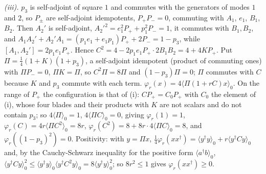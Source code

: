 \emph{(iii).} $p_{3}$ is self-adjoint of square $1$ and commutes with the generators of modes $1$ and $2$, so $P_{\pm}$ are self-adjoint idempotents, $P_{+}P_{-} = 0$, commuting with $A_{1}$, $e_{1}$, $B_{1}$, $B_{2}$. Then $A_{2}'$ is self-adjoint, $A_{2}'^{2} = e_{1}^{2}P_{+} + p_{1}^{2}P_{-} = 1$, it commutes with $B_{1}, B_{2}$, and $A_{1}A_{2}' + A_{2}'A_{1} = (p_{1}e_{1} + e_{1}p_{1})P_{+} + 2P_{-} = 1 - p_{3}$, while $[A_{1},A_{2}'] = 2p_{1}e_{1}P_{+}$. Hence $C^{2} = 4 - 2p_{1}e_{1}P_{+}\cdot 2B_{1}B_{2} = 4 + 4KP_{+}$. Put $\Pi = \tfrac14(1 + K)(1 + p_{3})$, a self-adjoint idempotent (product of commuting ones) with $\Pi P_{-} = 0$, $\Pi K = \Pi$, so $C^{2}\Pi = 8\Pi$ and $(1 - p_{3})\Pi = 0$; $\Pi$ commutes with $C$ because $K$ and $p_{3}$ commute with each term. $\varphi_{r}(x) = 4\langle\Pi(1 + rC)x\rangle_{0}$. On the range of $P_{+}$ the configuration is that of (i): $CP_{+} = C_{0}P_{+}$ with $C_{0}$ the element of (i), whose four blades and their products with $K$ are not scalars and do not contain $p_{3}$; so $4\langle\Pi\rangle_{0} = 1$, $4\langle\Pi C\rangle_{0} = 0$, giving $\varphi_{r}(1) = 1$, $\varphi_{r}(C) = 4r\langle\Pi C^{2}\rangle_{0} = 8r$, $\varphi_{r}(C^{2}) = 8 + 8r\cdot 4\langle\Pi C\rangle_{0} = 8$, and $\varphi_{r}((1 - p_{3})^{2}) = 0$. Positivity: with $y = \Pi x$, $\tfrac14\varphi_{r}(xx^{\dagger}) = \langle y^{\dagger}y\rangle_{0} + r\langle y^{\dagger}Cy\rangle_{0}$ and, by the Cauchy-Schwarz inequality for the positive form $\langle a^{\dagger}b\rangle_{0}$, $\langle y^{\dagger}Cy\rangle_{0}^{2} \le \langle y^{\dagger}y\rangle_{0}\langle y^{\dagger}C^{2}y\rangle_{0} = 8\langle y^{\dagger}y\rangle_{0}^{2}$; so $8r^{2} \le 1$ gives $\varphi_{r}(xx^{\dagger}) \ge 0$.
